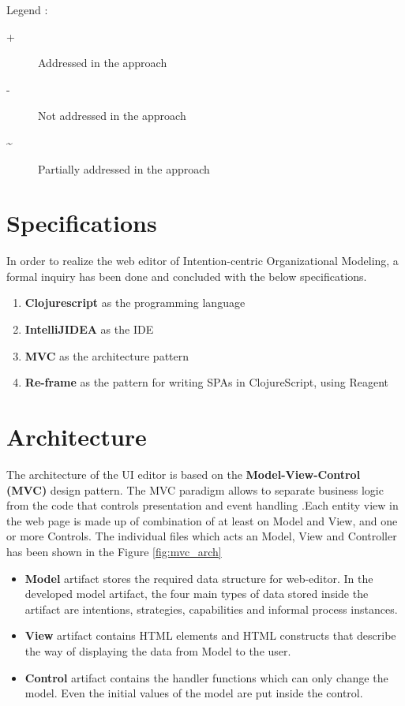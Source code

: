 Legend :
\begin{description}
	\item[+]  Addressed in the approach
	\item[-]  Not addressed in the approach
	\item[\~] Partially addressed in the approach
\end{description}

\section{Specifications}
\label{subsec:specifications}
In order to realize the web editor of Intention-centric Organizational Modeling, a formal inquiry has been done and concluded with the below specifications.

\begin{enumerate}   
	\item \textbf{Clojurescript} as the programming language
	\item \textbf{IntelliJIDEA} as the IDE
	\item \textbf{MVC} as the architecture pattern
	\item \textbf{Re-frame} as the pattern for writing SPAs in ClojureScript, using Reagent	
\end{enumerate}

\section{Architecture}
\label{subsec:mvcarch}
 The architecture of the UI editor is based on the \textbf{Model-View-Control (MVC)} design pattern. The MVC paradigm allows to separate business logic from the code that controls presentation and event handling \cite{Oracle2016}.Each entity view in the web page is made up of combination of at least on Model and View, and one or more Controls. The individual files which acts an Model, View and Controller has been shown in the Figure \ref{fig:mvc_arch}

\begin{itemize}
	\item \textbf{Model} artifact stores the required data structure for web-editor. In the developed model artifact, the four main types of data stored inside the artifact are intentions, strategies, capabilities and informal process instances. 
	\item \textbf{View} artifact contains HTML elements and HTML constructs that describe the way of displaying the data from Model to the user.
	\item \textbf{Control} artifact contains the handler functions which can only change the model. Even the initial values of the model are put inside the control. 
\end{itemize}


